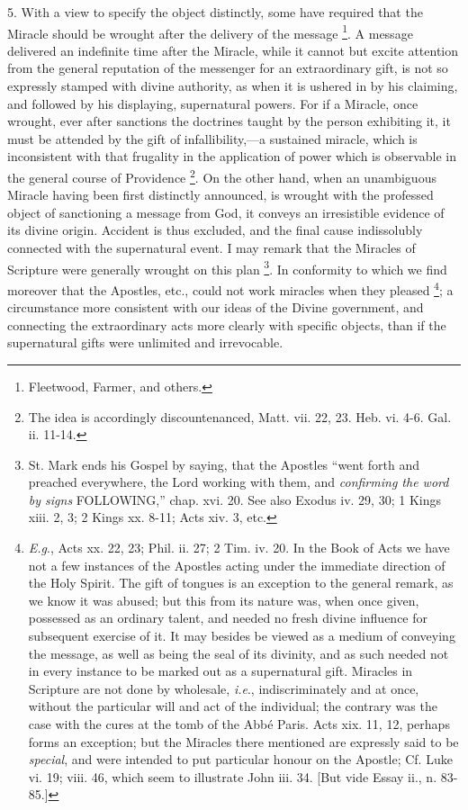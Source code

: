 5. With a view to specify the object distinctly,
some have required that the Miracle should be wrought after the
delivery of the message \footnote{Fleetwood, Farmer, and others.}. A message delivered an indefinite
time after the Miracle, while it cannot but excite attention from
the general reputation of the messenger for an extraordinary gift, is
not so expressly stamped with divine authority, as when it is ushered
in by his claiming, and followed by his displaying, supernatural
powers. For if a Miracle, once wrought, ever after sanctions the
doctrines taught by the person exhibiting it, it must be attended by
the gift of infallibility,—a sustained miracle, which is
inconsistent with that frugality in the application of power which is
observable in the general course of Providence \footnote{The idea is accordingly discountenanced,
Matt. vii. 22, 23. Heb. vi. 4-6. Gal. ii. 11-14.}. On the other
hand, when an unambiguous Miracle having been first distinctly
announced, is wrought with the professed object of sanctioning a
message from God, it conveys an irresistible evidence of its divine
origin. Accident is thus excluded, and the final cause indissolubly
connected with the supernatural event. I may remark that the Miracles
of Scripture were generally wrought on this plan \footnote{St. Mark ends his Gospel by saying, that the
Apostles ``went forth and preached everywhere, the Lord working
with them, and \emph{confirming the word by signs} FOLLOWING,''
chap. xvi. 20. See also Exodus iv. 29, 30; 1 Kings xiii. 2, 3; 2 Kings
xx. 8-11; Acts xiv. 3, etc.}. In
conformity to which we find moreover that the Apostles, etc., could
not work miracles when they pleased \footnote{\emph{E.g}., Acts xx. 22, 23; Phil. ii. 27; 2
Tim. iv. 20. In the Book of Acts we have not a few instances of the
Apostles acting under the immediate direction of the Holy Spirit. The
gift of tongues is an exception to the general remark, as we know it
was abused; but this from its nature was, when once given, possessed
as an ordinary talent, and needed no fresh divine influence for
subsequent exercise of it. It may besides be viewed as a medium of
conveying the message, as well as being the seal of its divinity, and
as such needed not in every instance to be marked out as a
supernatural gift. Miracles in Scripture are not done by wholesale, \emph{i.e}.,
indiscriminately and at once, without the particular will and act of
the individual; the contrary was the case with the cures at the tomb
of the Abbé Paris. Acts xix. 11, 12, perhaps forms an exception; but
the Miracles there mentioned are expressly said to be \emph{special},
and were intended to put particular honour on the Apostle; Cf. Luke
vi. 19; viii. 46, which seem to illustrate John iii. 34. [But vide
Essay ii., n. 83-85.]}; a circumstance more
consistent with our ideas of the Divine government, and
connecting the extraordinary acts more clearly with specific objects,
than if the supernatural gifts were unlimited and irrevocable.

